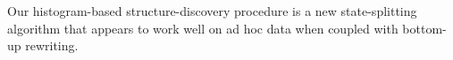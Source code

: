 



Our histogram-based structure-discovery procedure is a new state-splitting
algorithm that appears to work well on ad hoc data when coupled with
bottom-up rewriting.

